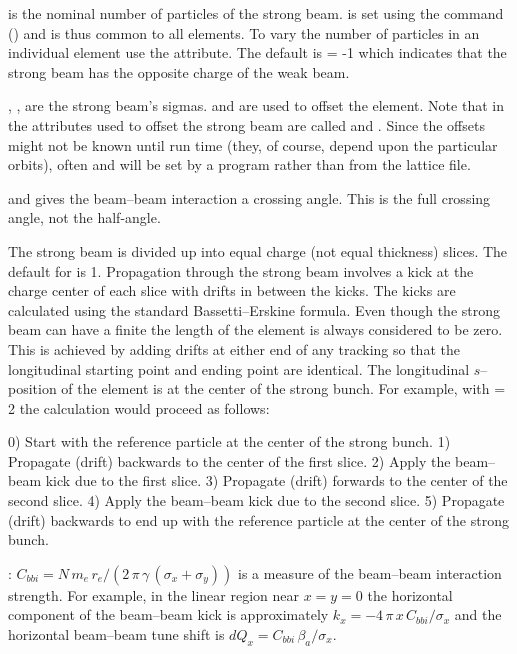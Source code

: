  is the nominal number of particles of the strong
beam.  is set using the  command
() and is thus common to all  elements.  To
vary the number of particles in an individual  element use the
 attribute. The default is  = -1 which indicates
that the strong beam has the opposite charge of the weak beam.

, ,  are the strong beam's sigmas. 
 and  are used to offset the
 element. Note that in \mad the attributes used to
offset the strong beam are called  and . Since the
offsets might not be known until run time (they, of course, depend
upon the particular orbits), often  and 
will be set by a program rather than from the lattice file.

 and  gives the beam--beam interaction a
crossing angle. This is the full crossing angle, not the half-angle.

The strong beam is divided up into  equal charge (not equal
thickness) slices. The default for  is 1. Propagation
through the strong beam involves a kick at the charge center of each
slice with drifts in between the kicks. The kicks are calculated using
the standard Bassetti--Erskine formula.  Even though the strong beam can
have a finite  the length of the element is always considered
to be zero. This is achieved by adding drifts at either end of any
tracking so that the longitudinal starting point and ending point are
identical. The longitudinal $s$--position of the
 element is at the center of the strong bunch. For example,
with  = 2 the calculation would proceed as follows:
\begin{example}
  0) Start with the reference particle at the center of the strong bunch.
  1) Propagate (drift) backwards to the center of the first slice.
  2) Apply the beam--beam kick due to the first slice.
  3) Propagate (drift) forwards to the center of the second slice.
  4) Apply the beam--beam kick due to the second slice.
  5) Propagate (drift) backwards to end up with the reference particle
     at the center of the strong bunch.
\end{example}

: $ C_{bbi} = 
N \, m_e \, r_e / (2 \, \pi \, \gamma \, (\sigma_x + \sigma_y))$ 
is a measure of the beam--beam interaction strength. For example,
in the linear region near $x = y = 0$ the horizontal component of the
beam--beam kick is approximately 
$k_x = -4\, \pi \, x \, C_{bbi} / \sigma_x$ and the
horizontal beam--beam tune shift is 
$dQ_x = C_{bbi} \, \beta_a / \sigma_x$.

